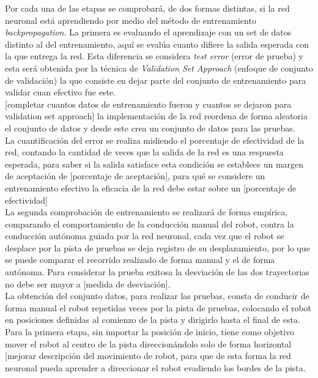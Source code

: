 \documentclass{iccmemoria}
\begin{document}
Por cada una de las etapas se comprobará, de dos formas distintas, si la red neuronal está aprendiendo por medio del método de entrenamiento \emph{backpropagation}. La primera es evaluando el aprendizaje con un set de datos distinto al del entrenamiento, aquí se evalúa cuanto difiere la salida esperada con la que entrega la red. Esta diferencia se considera \emph{test error} (error de prueba) y esta será obtenida por la técnica de \emph{Validation Set Approach} (enfoque de conjunto de validación) la que consiste en dejar parte del conjunto de entrenamiento para validar cuan efectivo fue este.\\

[completar cuantos datos de entrenamiento fueron y cuantos se dejaron para validation set approach]
la implementación de la red reordena de forma aleatoria el conjunto de datos y desde este crea un conjunto de datos para las pruebas.\\

La cuantificación del error se realiza midiendo el porcentaje de efectividad de la red, contando la cantidad de veces que la salida de la red es una respuesta esperada, para saber si la salida satisface esta condición se establece un margen de aceptación de [porcentaje de aceptación], para qué se considere un entrenamiento efectivo la eficacia de la red debe estar sobre un [porcentaje de efectividad]\\ 

La segunda comprobación de entrenamiento se realizará de forma empírica, comparando el comportamiento de la conducción manual del robot, contra la conducción autónoma guiada por la red neuronal, cada vez que el robot se desplace por la pista de pruebas se deja registro de su desplazamiento, por lo que se puede comparar el recorrido realizado de forma manual y el de forma autónoma. Para considerar la prueba exitosa la desviación de las dos trayectorias no debe ser mayor a [medida de desviación].\\

La obtención del conjunto datos, para realizar las pruebas, consta de conducir de forma manual el robot repetidas veces por la pista de pruebas, colocando el robot en posiciones definidas al comienzo de la pista y dirigirlo hasta el final de esta.\\

Para la primera etapa, sin importar la posición de inicio, tiene como objetivo mover el robot al centro de la pista direccionándolo solo de forma horizontal [mejorar descripción del movimiento de robot, para que de esta forma la red neuronal pueda aprender a direccionar el robot evadiendo los bordes de la pista.\\
\end{document}
